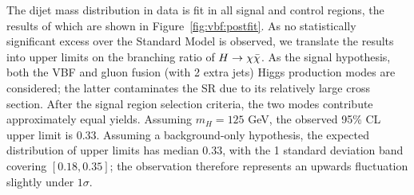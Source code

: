 The dijet mass distribution in data is fit in all signal and control regions, the results of which are shown in Figure~\ref{fig:vbf:postfit}.
As no statistically significant excess over the Standard Model is observed, we translate the results into upper limits on the branching ratio of $H\rightarrow\chi\bar\chi$.
As the signal hypothesis, both the VBF and gluon fusion (with 2 extra jets) Higgs production modes are considered; the latter contaminates the SR due to its relatively large cross section.
After the signal region selection criteria, the two modes contribute approximately equal yields. 
Assuming $m_H=125$ GeV, the observed 95\% CL upper limit is 0.33. 
Assuming a background-only hypothesis, the expected distribution of upper limits has median $0.33$, with the 1 standard deviation band covering $[0.18,0.35]$; the observation therefore represents an upwards fluctuation slightly under $1\sigma$. 

